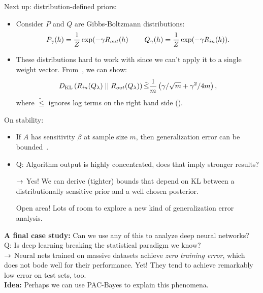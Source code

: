 Next up: distribution-defined priors:
\begin{itemize}
    \item Consider $P$ and $Q$ are Gibbs-Boltzmann distributions:
    \[
    P_\gamma(h) = \frac{1}{Z} \exp(-\gamma R_{out}(h) \hspace{8mm} Q_\gamma(h) = \frac{1}{Z}\exp(-\gamma R_{in}(h)).
    \]
    \item These distributions hard to work with since we can't apply it to a single weight vector. From~\citet{catoni2007pac}, we can show:
    \[
    D_{\text{KL}}\left(R_{in}(Q_\lambda) \mid \mid R_{out}(Q_\lambda)\right) \tilde{\leq} \frac{1}{m} \left(\gamma / \sqrt{m} + \gamma^2/4m\right),
    \]
    where $\tilde{\leq}$ ignores log terms on the right hand side ().
    
\end{itemize}

On stability:
\begin{itemize}
    \item If $A$ has sensitivity $\beta$ at sample size $m$, then generalization error can be bounded~\cite{bousquet2002stability}.
    
    \item Q: Algorithm output is highly concentrated, does that imply stronger results?
    
    $\rightarrow$ Yes! We can derive (tighter) bounds that depend on KL between a distributionally sensitive prior and a well chosen posterior.
    
    Open area! Lots of room to explore a new kind of generalization error analysis.
\end{itemize}

{\bf A final case study:} Can we use any of this to analyze deep neural networks? \\

Q: Is deep learning breaking the statistical paradigm we know? \\

$\rightarrow$ Neural nets trained on massive datasets achieve {\it zero training error}, which does not bode well for their performance. Yet! They tend to achieve remarkably low error on test sets, too. \\

{\bf Idea:} Perhaps we can use PAC-Bayes to explain this phenomena. \\



